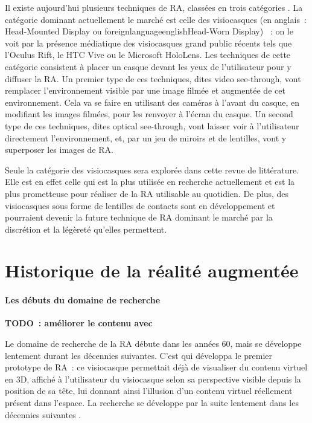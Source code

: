 Il existe aujourd'hui plusieurs techniques de RA, classées en trois catégories . La catégorie dominant actuellement le marché est celle des visiocasques (en anglais~: \foreignlanguage{english}{Head-Mounted Display} ou foreignlanguage{english}{Head-Worn Display}) \citep{VanKrevelenPoelman2010}~: on le voit par la présence médiatique des visiocasques grand public récents tels que l'Oculus Rift, le HTC Vive ou le Microsoft HoloLens. Les techniques de cette catégorie consistent à placer un casque devant les yeux de l'utilisateur pour y diffuser la RA. Un premier type de ces techniques, dites \foreignlanguage{english}{video see-through}, vont remplacer l'environnement visible par une image filmée et augmentée de cet environnement. Cela va se faire en utilisant des caméras à l'avant du casque, en modifiant les images filmées, pour les renvoyer à l'écran du casque. Un second type de ces techniques, dites \foreignlanguage{english}{optical see-through}, vont laisser voir à l'utilisateur directement l'environnement, et, par un jeu de miroirs et de lentilles, vont y superposer les images de RA.


Seule la catégorie des visiocasques sera explorée dans cette revue de littérature. Elle est en effet celle qui est la plus utilisée en recherche actuellement et est la plus prometteuse pour réaliser de la RA utilisable au quotidien. \cite{CarmignianiFurhtAnisettiEtAl2011} De plus, des visiocasques sous forme de lentilles de contacts sont en développement et pourraient devenir la future technique de RA dominant le marché par la discrétion et la légèreté qu'elles permettent. \citep{VanKrevelenPoelman2010}



\section*{Historique de la réalité augmentée}
\paragraph*{Les débuts du domaine de recherche}
\textbf{TODO~: améliorer le contenu avec \cite{Chalon2004}}

Le domaine de recherche de la RA débute dans les années 60, mais se développe lentement durant les décennies suivantes. C'est \citet{Sutherland1968} qui développa le premier prototype de RA~: ce visiocasque permettait déjà de visualiser du contenu virtuel en 3D, affiché à l'utilisateur du visiocasque selon sa perspective visible depuis la position de sa tête, lui donnant ainsi l'illusion d'un contenu virtuel réellement présent dans l'espace. La recherche se développe par la suite lentement dans les décennies suivantes \citep{VanKrevelenPoelman2010} \citep{CarmignianiFurhtAnisettiEtAl2011}.

